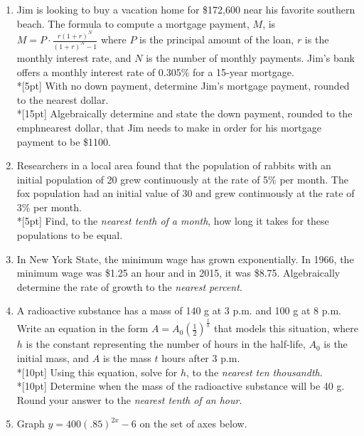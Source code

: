 \documentclass[12pt, oneside]{article}
\begin{document}
\begin{enumerate}
\item Jim is looking to buy a vacation home for \$172,600 near his favorite southern beach. The formula to compute a mortgage payment, $M$, is $\displaystyle M=P \cdot \frac{r(1+r)^N}{(1+r)^N-1}$ where $P$ is the principal amount of the loan, $r$ is the monthly interest rate, and $N$ is the number of monthly payments. Jim’s bank offers a monthly interest rate of 0.305\% for a 15-year mortgage.\\*[5pt]
With no down payment, determine Jim’s mortgage payment, rounded to the nearest dollar.\\*[15pt]
Algebraically determine and state the down payment, rounded to the emph{nearest dollar}, that Jim needs to make in order for his mortgage payment to be \$1100.

\item Researchers in a local area found that the population of rabbits with an initial population of 20 grew continuously at the rate of 5\% per month. The fox population had an initial value of 30 and grew continuously at the rate of 3\% per month.\\*[5pt]
Find, to the \emph{nearest tenth of a month}, how long it takes for these populations to be equal.%

\item In New York State, the minimum wage has grown exponentially. In 1966, the minimum wage was \$1.25 an hour and in 2015, it was \$8.75. Algebraically determine the rate of growth to the \emph{nearest percent}.

\item A radioactive substance has a mass of 140 g at 3 p.m. and 100 g at 8 p.m. Write an equation in the form $A = A_0 \left( \frac{1}{2} \right)^{\frac{t}{h}}$ that models this situation, where $h$ is the constant representing the number of hours in the half-life, $A_0$ is the initial mass, and $A$ is the mass $t$ hours after 3 p.m.\\*[10pt]
Using this equation, solve for $h$, to the \emph{nearest ten thousandth}. \\*[10pt]
Determine when the mass of the radioactive substance will be 40 g. Round your answer to the \emph{nearest tenth of an hour}.
 
\item Graph $y=400(.85)^{2x}-6$ on the set of axes below.
\begin{center}
\end{center} %


\end{enumerate}
\end{document}
